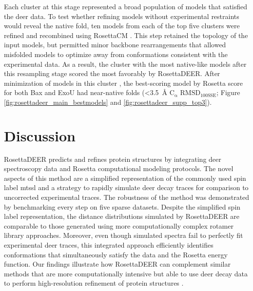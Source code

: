 Each cluster at this stage represented a broad population of models that satisfied the \gls{deer} data. To test whether refining models without experimental restraints would reveal the native fold, ten models from each of the top five clusters were refined and recombined using RosettaCM \citep*{Song2013}. This step retained the topology of the input models, but permitted minor backbone rearrangements that allowed misfolded models to optimize away from conformations consistent with the experimental data. As a result, the cluster with the most native-like models after this resampling stage scored the most favorably by RosettaDEER. After minimization of models in this cluster \citep*{Conway2014}, the best-scoring model by Rosetta score for both Bax and ExoU had near-native folds (<\SI{3.5}{\angstrom} $\mathrm{C_{\upalpha}}$ $\mathrm{RMSD_{100SSE}}$; Figure \ref{fig:rosettadeer_main_bestmodels} and \ref{fig:rosettadeer_supp_top3}).

\section{Discussion}

RosettaDEER predicts and refines protein structures by integrating \gls{deer} spectroscopy data and Rosetta computational modeling protocols. The novel aspects of this method are a simplified representation of the commonly used spin label \gls{mtssl} and a strategy to rapidly simulate \gls{deer} decay traces for comparison to uncorrected experimental traces. The robustness of the method was demonstrated by benchmarking every step on five sparse datasets. Despite the simplified spin label representation, the distance distributions simulated by RosettaDEER are comparable to those generated using more computationally complex rotamer library approaches. Moreover, even though simulated spectra fail to perfectly fit experimental \gls{deer} traces, this integrated approach efficiently identifies conformations that simultaneously satisfy the data and the Rosetta energy function. Our findings illustrate how RosettaDEER can complement similar methods that are more computationally intensive but able to use \gls{deer} decay data to perform high-resolution refinement of protein structures \citep*{Marinelli2019}.

